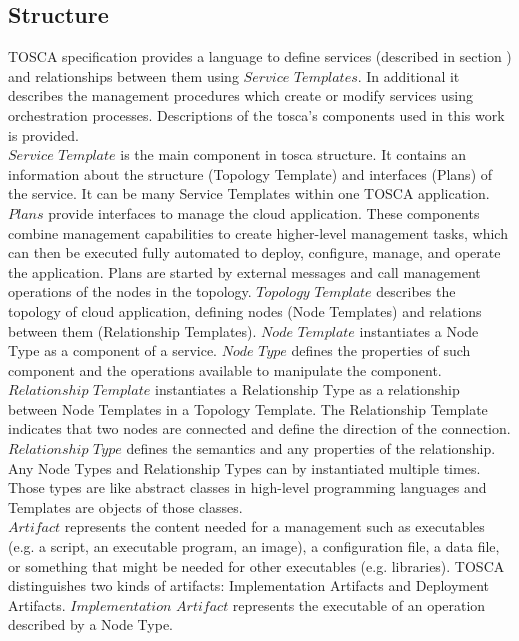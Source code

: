 \subsection*{Structure}
TOSCA specification provides a language to define services (described in section ) and relationships between them using $Service$ $Templates$. 
In additional it describes the management procedures which create or modify services using orchestration processes.
Descriptions of the \gls{tosca}'s components used in this work is provided. \\
$Service$ $Template$ is the main component in \gls{tosca} structure. 
It contains an information about the structure (Topology Template) and interfaces (Plans) of the service. 
It can be many Service Templates within one TOSCA application. %
$Plans$ provide interfaces to manage the cloud application.
These components combine management capabilities to create higher-level management tasks, which can then be executed fully automated to deploy, configure, manage, and operate the application.
Plans are started by external messages and call management operations of the nodes in the topology. %
$Topology$ $Template$ describes the topology of cloud application, defining nodes (Node Templates) and relations between them (Relationship Templates). %
$Node$ $Template$ instantiates a Node Type as a component of a service. 
$Node$ $Type$ defines the properties of such component and the operations available to manipulate the component.
$Relationship$ $Template$ instantiates a Relationship Type as a relationship between Node Templates in a Topology Template. 
The Relationship Template indicates that two nodes are connected and define the direction of the connection.
$Relationship$ $Type$ defines the semantics and any properties of the relationship.\label{subs:reltype} %
Any Node Types and Relationship Types can by instantiated multiple times.
Those types are like abstract classes in high-level programming languages and Templates are objects of those classes.\\
$Artifact$ represents the content needed for a management such as executables (e.g. a script, an executable program, an image), a configuration file, a data file, or something that might be needed for other executables (e.g. libraries).
TOSCA distinguishes two kinds of artifacts: Implementation Artifacts and Deployment Artifacts.
$Implementation$ $Artifact$ represents the executable of an operation described by a Node Type.
